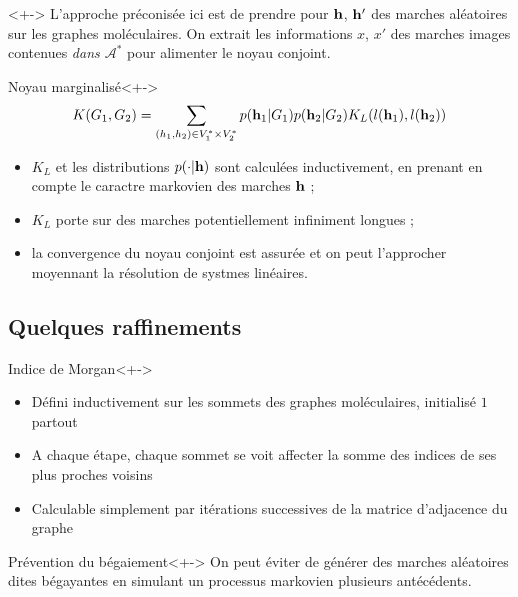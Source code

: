 \begin{frame}
\begin{block}{}<+->
L'approche pr\'econis\'ee ici est de prendre pour $\mathbf{h}$, $\mathbf{h}'$ des marches al\'eatoires sur les graphes mol\'eculaires. %
On extrait les informations $x$, $x'$ des marches images contenues \emph{dans $\mathcal{A}^{\ast}$} pour alimenter le noyau conjoint.
\end{block}
\begin{block}{Noyau marginalis\'e}<+->
\[K(G_1,G_2) = \sum\limits_{(h_1,h_2) \in V_1^{\ast} \times V_2^{\ast}}p(\mathbf{h}_1|G_1)p(\mathbf{h}_2|G_2)K_L(l(\mathbf{h}_1),l(\mathbf{h}_2))\]
\end{block}
\end{frame}

\begin{frame}
\begin{itemize}
\item<+-> $K_L$ et les distributions $p(\cdot |\mathbf{h})$ sont calcul\'ees inductivement, en prenant en compte le caractre markovien des marches $\mathbf{h}$ ;
\item<+-> $K_L$ porte sur des marches potentiellement infiniment longues ;
\item<+-> la convergence du noyau conjoint est assur\'ee et on peut l'approcher moyennant la r\'esolution de systmes lin\'eaires.
\end{itemize}
\end{frame}

\subsection{Quelques raffinements}

\begin{frame}
\begin{block}{Indice de Morgan}<+->
\begin{itemize}
\item<+-> D\'efini inductivement sur les sommets des graphes mol\'eculaires, initialis\'e  $1$ partout
\item<+-> A chaque \'etape, chaque sommet se voit affecter la somme des indices de ses plus proches voisins
\item<+-> Calculable simplement par it\'erations successives de la matrice d'adjacence du graphe
\end{itemize}
\end{block}
\begin{block}{Pr\'evention du b\'egaiement}<+->
On peut \'eviter de g\'en\'erer des marches al\'eatoires dites b\'egayantes en simulant un processus markovien  plusieurs ant\'ec\'edents.
\end{block}
\end{frame}

